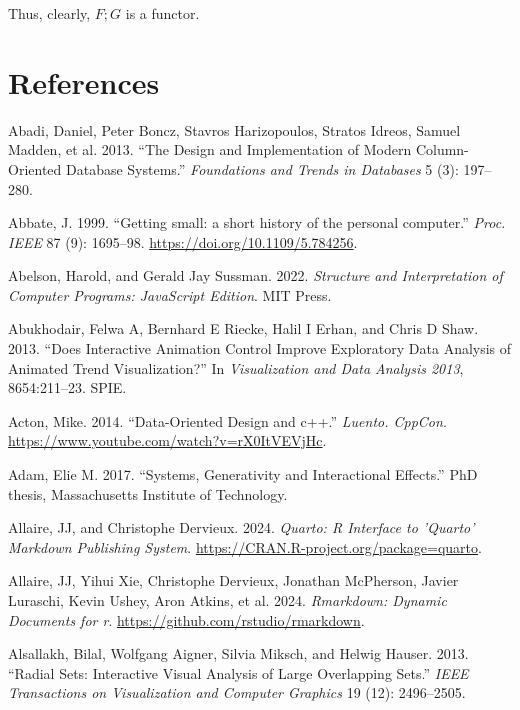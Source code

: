\documentclass[
  openany]{book}
\newlength{\cslhangindent}
\newenvironment{CSLReferences}[2] %
 {\begin{list}{}{%
  \setlength{\itemindent}{0pt}
  \setlength{\leftmargin}{0pt}
  \setlength{\parsep}{0pt}
  \ifodd #1
   \setlength{\leftmargin}{\cslhangindent}
   \setlength{\itemindent}{-1\cslhangindent}
  \fi
  \setlength{\itemsep}{#2\baselineskip}}}
 {\end{list}}
\theoremstyle{definition}
\theoremstyle{definition}
\theoremstyle{definition}
\theoremstyle{definition}
\theoremstyle{remark}
\begin{document}
Thus, clearly, \(F ;G\) is a functor.

\chapter{References}\label{references}

\label{refs}
\begin{CSLReferences}{1}{0}
Abadi, Daniel, Peter Boncz, Stavros Harizopoulos, Stratos Idreos, Samuel Madden, et al. 2013. {``The Design and Implementation of Modern Column-Oriented Database Systems.''} \emph{Foundations and Trends{\textregistered} in Databases} 5 (3): 197--280.

Abbate, J. 1999. {``{Getting small: a short history of the personal computer}.''} \emph{Proc. IEEE} 87 (9): 1695--98. \url{https://doi.org/10.1109/5.784256}.

Abelson, Harold, and Gerald Jay Sussman. 2022. \emph{Structure and Interpretation of Computer Programs: JavaScript Edition}. MIT Press.

Abukhodair, Felwa A, Bernhard E Riecke, Halil I Erhan, and Chris D Shaw. 2013. {``Does Interactive Animation Control Improve Exploratory Data Analysis of Animated Trend Visualization?''} In \emph{Visualization and Data Analysis 2013}, 8654:211--23. SPIE.

Acton, Mike. 2014. {``Data-Oriented Design and c++.''} \emph{Luento. CppCon}. \url{https://www.youtube.com/watch?v=rX0ItVEVjHc}.

Adam, Elie M. 2017. {``Systems, Generativity and Interactional Effects.''} PhD thesis, Massachusetts Institute of Technology.

Allaire, JJ, and Christophe Dervieux. 2024. \emph{Quarto: R Interface to 'Quarto' Markdown Publishing System}. \url{https://CRAN.R-project.org/package=quarto}.

Allaire, JJ, Yihui Xie, Christophe Dervieux, Jonathan McPherson, Javier Luraschi, Kevin Ushey, Aron Atkins, et al. 2024. \emph{Rmarkdown: Dynamic Documents for r}. \url{https://github.com/rstudio/rmarkdown}.

Alsallakh, Bilal, Wolfgang Aigner, Silvia Miksch, and Helwig Hauser. 2013. {``Radial Sets: Interactive Visual Analysis of Large Overlapping Sets.''} \emph{IEEE Transactions on Visualization and Computer Graphics} 19 (12): 2496--2505.


\end{CSLReferences}
\end{document}
